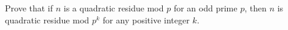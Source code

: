 Prove that if $n$ is a quadratic residue mod $p$ for an odd prime $p$, then $n$ is quadratic residue mod $p^k$ for any positive integer $k$.